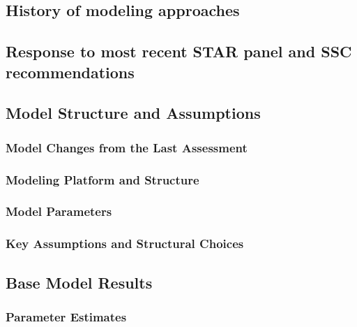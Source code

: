\documentclass[
]{scrartcl}
\begin{document}
\subsection{History of modeling
approaches}\label{history-of-modeling-approaches}

\subsection{Response to most recent STAR panel and SSC
recommendations}\label{response-to-most-recent-star-panel-and-ssc-recommendations}

\subsection{Model Structure and
Assumptions}\label{model-structure-and-assumptions}

\subsubsection{Model Changes from the Last
Assessment}\label{model-changes-from-the-last-assessment}

\subsubsection{Modeling Platform and
Structure}\label{modeling-platform-and-structure}

\subsubsection{Model Parameters}\label{model-parameters}

\subsubsection{Key Assumptions and Structural
Choices}\label{key-assumptions-and-structural-choices}

\newpage{}

\subsection{Base Model Results}\label{base-model-results}

\subsubsection{Parameter Estimates}\label{parameter-estimates}
\end{document}
